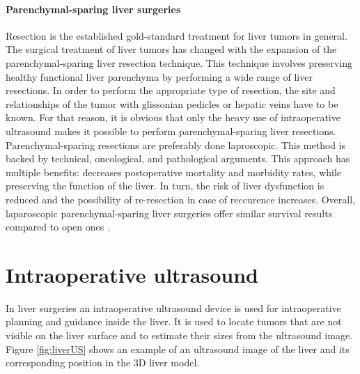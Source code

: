 \paragraph{Parenchymal-sparing liver surgeries}
Resection is the established gold-standard treatment for liver tumors in
general. The surgical treatment of liver tumors has changed with the expansion of the
parenchymal-sparing liver resection technique. This technique involves preserving healthy
functional liver parenchyma by performing a wide range of liver resections. In
order to perform the appropriate type of resection, the site and
relationships of the tumor with glissonian pedicles or hepatic veins have to be
known.
For that reason, it is obvious that only the heavy use of intraoperative 
ultrasound makes it possible to perform parenchymal-sparing liver resections.
Parenchymal-sparing resections are preferably done laproscopic. This method is backed by technical, oncological,
and pathological arguments.
This approach has multiple benefits: decreases postoperative mortality and
morbidity rates, while preserving the function of the liver. In turn, the risk
of liver dysfunction is reduced and the possibility of re-resection in case of
reccurence increases. Overall, laparoscopic parenchymal-sparing liver surgeries offer
similar survival results compared to open ones \cite{Ferrero2017}.



\section{Intraoperative ultrasound}
In liver surgeries an intraoperative ultrasound device is used for intraoperative planning and
guidance inside the liver. It is used to locate tumors that are not
visible on the liver surface and to estimate their sizes from the ultrasound image. Figure \ref{fig:liverUS} shows an example of an
ultrasound image of the liver and its corresponding position in the 3D liver
model.

